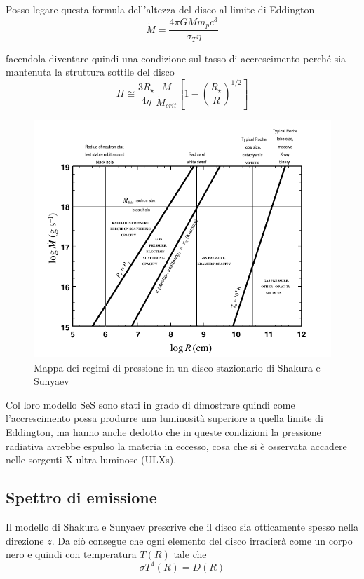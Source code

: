 \documentclass[a4paperbi]{article}
\begin{document}
	Posso legare questa formula dell'altezza del disco al limite di Eddington
	\begin{equation*}
		\dot{M}=\frac{4\pi GMm_pc^3}{\sigma_T \eta}
	\end{equation*}
	
	facendola diventare quindi una condizione sul tasso di accrescimento perché sia mantenuta la struttura sottile del disco
	\begin{equation}
		H\cong\frac{3R_{\star}}{4\eta}\frac{\dot{M}}{\dot{M}_{crit}}\left[1-\left(\frac{R_{\star}}{R}\right)^{1/2}\right]
	\end{equation}
	
	\begin{figure}[H]
		\centering
		\includegraphics[width=1\linewidth]{MappaPressione}
		\caption{Mappa dei regimi di pressione in un disco stazionario di Shakura e Sunyaev}
		\label{fig:MappaPressione}
	\end{figure}
	
	Col loro modello SeS sono stati in grado di dimostrare quindi come l'accrescimento possa produrre una luminosità superiore a quella limite di Eddington, ma hanno anche dedotto che in queste condizioni la pressione radiativa avrebbe espulso la materia in eccesso, cosa che si è osservata accadere  nelle sorgenti X ultra-luminose (ULXs).
	
\subsection{Spettro di emissione}
	Il modello di Shakura e Sunyaev prescrive che il disco sia otticamente spesso nella direzione $z$. Da ciò consegue che ogni elemento del disco irradierà come un corpo nero e quindi con temperatura $T(R)$ tale che
	\begin{equation}
		\sigma T^4(R)=D(R)
	\end{equation}
	
\end{document}
